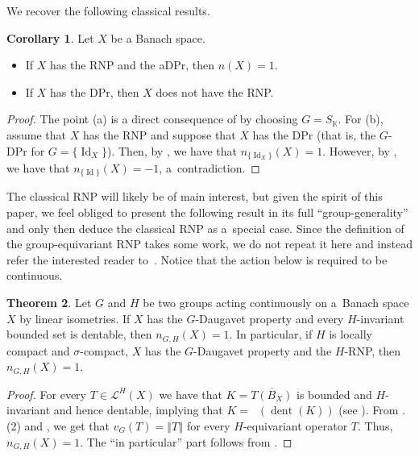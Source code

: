\documentclass[a4paper,12pt]{amsart}
\theoremstyle{definition}
\newtheorem{theorem}{Theorem}[section]
\newtheorem{corollary}[theorem]{Corollary}
\theoremstyle{definition}
\theoremstyle{remark}
\numberwithin{equation}{section}
\newcommand{\K}{\mathbb{K}}
\newcommand{\clco}{\mathop{\overline{\mathrm{co}}}\nolimits}
\DeclareMathOperator{\id}{Id}
\newcommand{\<}{\langle}
\renewcommand{\>}{\rangle}
\newcommand{\norm}[1]{\left\Vert#1\right\Vert}
\newcommand{\dent}[1]{\operatorname{dent}\left(#1\right)}
\begin{document}
	
	We recover the following classical results.
	
	\begin{corollary} \label{classical-RNPs} Let $X$ be a Banach space.
		\begin{itemize}
			\item[(a)] If $X$ has the RNP and the aDPr, then $n(X) = 1$.
			\item[(b)] If $X$ has the DPr, then $X$ does not have the RNP.
		\end{itemize}
	\end{corollary}
	
	\begin{proof} The point (a) is a direct consequence of  by choosing $G = S_\K$. For (b), assume that $X$ has the RNP and suppose that $X$ has the DPr (that is, the $G$-DPr for $G =\{\id_X\}$). Then, by , we have that $n_{\{\id_X\}}(X) = 1$. However, by , we have that $n_{\{\id\}}(X) = -1$, a~contradiction.
	\end{proof}
	
	The classical RNP will likely be of main interest, but given the spirit of this paper, we feel obliged to present the following result in its full ``group-generality'' and only then deduce the classical RNP as a~special case. Since the definition of the group-equivariant RNP takes some work, we do not repeat it here and instead refer the interested reader to~\cite{DantasDouchaJungRaunig2025}. Notice that the action below is required to be continuous.
	
	\begin{theorem} \label{thm:GDPandGRNP}
		Let $G$ and $H$ be two groups acting continuously on a~Banach space $X$ by linear isometries. If $X$ has the $G$-Daugavet property and every $H$-invariant bounded set is dentable, then $n_{G, H}(X) = 1$.
		In particular, if $H$ is locally compact and $\sigma$-compact, $X$ has the $G$-Daugavet property and the $H$-RNP, then $n_{G, H}(X) = 1$.
	\end{theorem}
	\begin{proof}
		For every $T \in \mathcal{L}^H(X)$ we have that $K = \overline{T(B_X)}$ is bounded and $H$-invariant and hence dentable, implying that $K = \clco (\dent K)$ (see \cite[III.3]{GGMS87}). From .(2) and , we get that $v_G(T) = \norm{T}$ for every $H$-equivariant operator $T$. Thus, $n_{G, H}(X) = 1$.
		The ``in particular'' part follows from \cite[Theorem~6.4]{DantasDouchaJungRaunig2025}.
	\end{proof}
	
\end{document}
